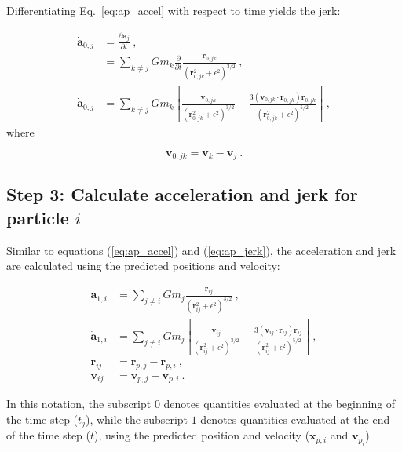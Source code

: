 \begin{appendixs}
	Differentiating Eq.~\eqref{eq:ap_accel} with respect to time yields the jerk:
	
	\begin{align}
		\dot{\mathbf{a}}_{0, j} &= \frac{\partial \mathbf{a}_j}{\partial t} ~,\\
		&= \sum_{k \neq j} G m_k \frac{\partial}{\partial t}\frac{\mathbf{r}_{0,jk}}{(\mathbf{r}_{0,jk}^2 + \epsilon^2)^{3/2}} ~,\\
		\dot{\mathbf{a}}_{0, j} &= \sum_{k \neq j} G m_k \left[\frac{\mathbf{v}_{0,jk}}{(\mathbf{r}_{0,jk}^2 + \epsilon^2)^{3/2}} - \frac{3(\mathbf{v}_{0,jk} \cdot \mathbf{r}_{0,jk})\mathbf{r}_{0,jk}}{(\mathbf{r}_{0,jk}^2 + \epsilon^2)^{5/2}}\right] ~,\label{eq:ap_jerk}
	\end{align}
	where
	
	\begin{equation}
		\mathbf{v}_{0,jk} = \mathbf{v}_{k} - \mathbf{v}_{j}~.
	\end{equation}
	
	\subsection{Step 3: Calculate acceleration and jerk for particle $i$}
	\label{ap:A.3}
	
	Similar to equations (\ref{eq:ap_accel}) and (\ref{eq:ap_jerk}), the acceleration and jerk are calculated using the predicted positions and velocity:
	
	\begin{align}
		\mathbf{a}_{1, i} &= \sum_{j \neq i} G m_j \frac{\mathbf{r}_{ij}}{(\mathbf{r}_{ij}^2 + \epsilon^2)^{3/2}} \label{eq:ap_accel_pred} ~,\\
		\dot{\mathbf{a}}_{1, i} &= \sum_{j \neq i} G m_j \left[\frac{\mathbf{v}_{ij}}{(\mathbf{r}_{ij}^2 + \epsilon^2)^{3/2}} - \frac{3(\mathbf{v}_{ij} \cdot \mathbf{r}_{ij})\mathbf{r}_{ij}}{(\mathbf{r}_{ij}^2 + \epsilon^2)^{5/2}}\right] \label{eq:ap_jerk_pred} ~,\\
		\mathbf{r}_{ij} &= \mathbf{r}_{p,j} - \mathbf{r}_{p,i} ~, \\
		\mathbf{v}_{ij} &= \mathbf{v}_{p,j} - \mathbf{v}_{p,i} ~.
	\end{align}
	
	In this notation, the subscript $0$ denotes quantities evaluated at the beginning of the time step ($t_j$), while the subscript $1$ denotes quantities evaluated at the end of the time step ($t$), using the predicted position and velocity ($\mathbf{x}_{p, i}$ and $\mathbf{v}_{p_i}$).
	

\end{appendixs}

